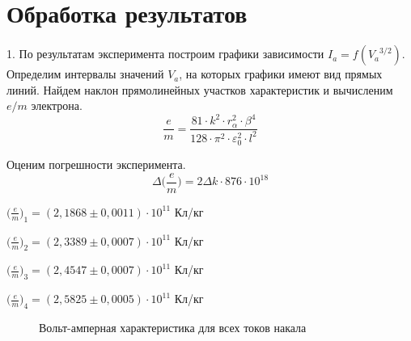 \documentclass[a4paper,12pt]{article}
\begin{document}
\section{Обработка результатов}

\par 1. По результатам эксперимента построим графики зависимости $I_a = f({V_a}^{3/2})$. Определим интервалы значений $V_a$, на которых графики имеют вид прямых линий. Найдем наклон прямолинейных участков характеристик и вычисленим $e/m$ электрона.
\begin{equation}
\frac{e}{m} = \frac{81 \cdot k^2 \cdot r_{\alpha}^2 \cdot \beta^4}{128 \cdot \pi^2 \cdot \varepsilon_0^2 \cdot l^2}
\end{equation}

\par Оценим погрешности эксперимента.
\begin{equation}
\Delta \big(\frac{e}{m}\big) = 2\Delta k \cdot 876 \cdot 10^{18}
\end{equation}

\par $\big(\frac{e}{m}\big)_1 = (2,1868 \pm 0,0011) \cdot 10^{11}$ Кл/кг
\par $\big(\frac{e}{m}\big)_2 = (2,3389 \pm 0,0007) \cdot 10^{11}$ Кл/кг
\par $\big(\frac{e}{m}\big)_3 = (2,4547 \pm 0,0007) \cdot 10^{11}$ Кл/кг
\par $\big(\frac{e}{m}\big)_4 = (2,5825 \pm 0,0005) \cdot 10^{11}$ Кл/кг

\begin{figure} 
	\centering
	\caption{Вольт-амперная характеристика для всех токов накала}
	\label{mah}
\end{figure}
\end{document}

